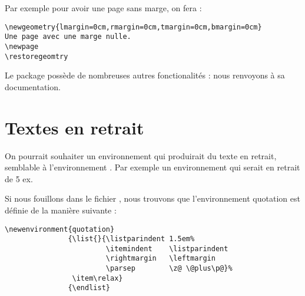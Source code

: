 Par exemple pour avoir une page sans marge, on fera :

\begin{verbatim}
\newgeometry{lmargin=0cm,rmargin=0cm,tmargin=0cm,bmargin=0cm}
Une page avec une marge nulle.
\newpage
\restoregeomtry

\end{verbatim}

Le package  possède de nombreuses autres fonctionalités : nous renvoyons à sa documentation.

\section{Textes en retrait}

On pourrait souhaiter un environnement qui produirait du texte en retrait, semblable à l'environnement . Par exemple un environnement  qui serait en retrait de 5 ex.

Si nous fouillons dans le fichier , nous trouvons que l'environnement quotation est définie de la manière suivante :

\begin{verbatim}
\newenvironment{quotation}
               {\list{}{\listparindent 1.5em%
                        \itemindent    \listparindent
                        \rightmargin   \leftmargin
                        \parsep        \z@ \@plus\p@}%
                \item\relax}
               {\endlist}
\end{verbatim}

